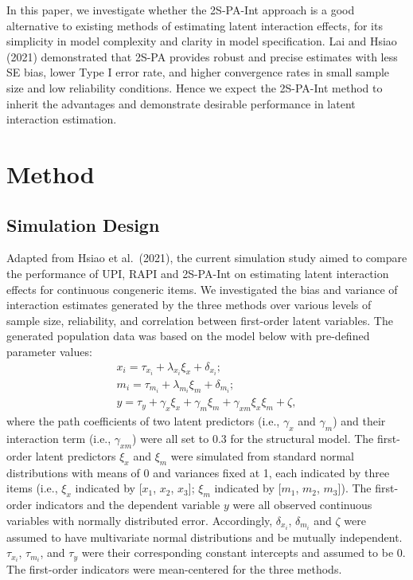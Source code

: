 \documentclass[
  man]{apa6}
\begin{document}
In this paper, we investigate whether the 2S-PA-Int approach is a good alternative to existing methods of estimating latent interaction effects, for its simplicity in model complexity and clarity in model specification. Lai and Hsiao (2021) demonstrated that 2S-PA provides robust and precise estimates with less SE bias, lower Type I error rate, and higher convergence rates in small sample size and low reliability conditions. Hence we expect the 2S-PA-Int method to inherit the advantages and demonstrate desirable performance in latent interaction estimation.

\hypertarget{method}{%
\section{Method}\label{method}}

\hypertarget{simulation-design}{%
\subsection{Simulation Design}\label{simulation-design}}

Adapted from Hsiao et al.~(2021), the current simulation study aimed to compare the performance of UPI, RAPI and 2S-PA-Int on estimating latent interaction effects for continuous congeneric items. We investigated the bias and variance of interaction estimates generated by the three methods over various levels of sample size, reliability, and correlation between first-order latent variables. The generated population data was based on the model below with pre-defined parameter values:
\begin{equation}
\begin{gathered}
x_{i} =  \tau_{x_{i}} + \lambda_{x_{i}}\xi_{x} + \delta_{x_{i}};\\
m_{i} =  \tau_{m_{i}} + \lambda_{m_{i}}\xi_{m} + \delta_{m_{i}};\\
y =  \tau_{y} + \gamma_{x}\xi_{x} + \gamma_{m}\xi_{m} + \gamma_{xm}\xi_{x}\xi_{m} + \zeta,
\end{gathered}
\end{equation}
where the path coefficients of two latent predictors (i.e., \(\gamma_{x}\) and \(\gamma_{m}\)) and their interaction term (i.e., \(\gamma_{xm}\)) were all set to 0.3 for the structural model. The first-order latent predictors \(\xi_{x}\) and \(\xi_{m}\) were simulated from standard normal distributions with means of 0 and variances fixed at 1, each indicated by three items (i.e., \(\xi_{x}\) indicated by {[}\(x_{1}\), \(x_{2}\), \(x_{3}\){]}; \(\xi_{m}\) indicated by {[}\(m_{1}\), \(m_{2}\), \(m_{3}\){]}). The first-order indicators and the dependent variable \(y\) were all observed continuous variables with normally distributed error. Accordingly, \(\delta_{x_{i}}\), \(\delta_{m_{i}}\) and \(\zeta\) were assumed to have multivariate normal distributions and be mutually independent. \(\tau_{x_{i}}\), \(\tau_{m_{i}}\), and \(\tau_{y}\) were their corresponding constant intercepts and assumed to be 0. The first-order indicators were mean-centered for the three methods.
\end{document}
